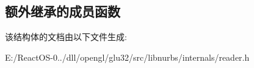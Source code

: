 \subsection*{额外继承的成员函数}


该结构体的文档由以下文件生成\+:\begin{DoxyCompactItemize}
\item 
E\+:/\+React\+O\+S-\/0../dll/opengl/glu32/src/libnurbs/internals/reader.\+h\end{DoxyCompactItemize}

